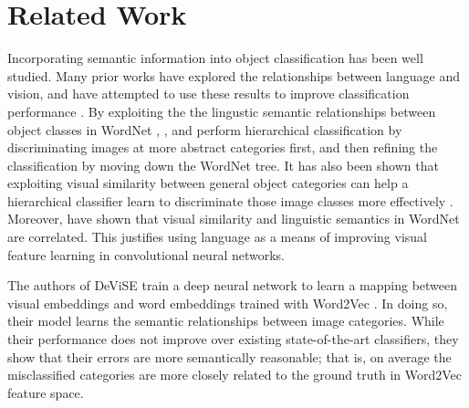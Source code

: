 \section{Related Work}


Incorporating semantic information into object classification has been well
studied. Many prior works have explored the relationships between language and
vision, and have attempted to use these results to improve classification
performance \cite{izadinia2015segment, frome2013devise}.
By exploiting the the lingustic semantic relationships between object classes
in WordNet \cite{miller1995wordnet}, \cite{marszalek2007semantic}, and
\cite{grauman2011learning} perform hierarchical classification by
discriminating images at more abstract categories first, and then refining the
classification by moving down the WordNet tree.
It has also been shown that exploiting visual similarity between general object
categories can help a hierarchical classifier learn to discriminate those image
classes more effectively \cite{li2010building}.
Moreover, \cite{deselaers2011visual} have shown that visual similarity and
linguistic semantics in WordNet are correlated. This justifies using language
as a means of improving visual feature learning in convolutional neural
networks.


The authors of DeViSE \cite{frome2013devise} train a deep neural network to
learn a mapping between visual embeddings and word embeddings trained with
Word2Vec \cite{mikolov2013distributed}. In doing so, their model learns the
semantic relationships between image categories. While their performance does
not improve over existing state-of-the-art classifiers, they show that their
errors are more semantically reasonable; that is, on average the misclassified
categories are more closely related to the ground truth in Word2Vec feature
space.


